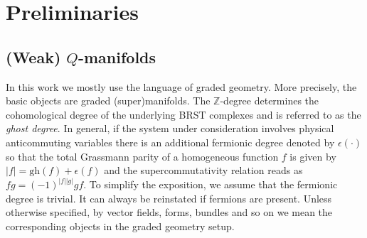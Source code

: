 \documentclass[a4paper,12pt]{article}
\numberwithin{equation}{section} %
\newcommand{\p}[1]{|#1|}
\newcommand{\gh}[1]{\mathrm{gh}(#1)}
\newcommand{\fZ}{\mathbb{Z}}
\begin{document}



\section{Preliminaries}\label{sec:prelim}

\subsection{(Weak) $Q$-manifolds}
In this work we mostly use the language of graded geometry. More precisely, the basic objects are graded (super)manifolds. The $\fZ$-degree determines the 
cohomological degree of the underlying BRST complexes and is referred to as the \textit{ghost degree}. In general, if the system under consideration involves physical anticommuting variables there is an additional fermionic degree denoted by $\epsilon(\cdot)$
 so that the total Grassmann parity of a homogeneous function $f$ is given by $\p{f}=\gh{f}+\epsilon(f)$
 and the supercommutativity relation reads as $fg=(-1)^{\p{f}\p{g}}gf$.
To simplify the exposition, we assume that the fermionic degree is trivial. It can always be reinstated if fermions are present. Unless otherwise specified, by vector fields, forms, bundles and so on we mean the corresponding objects in the graded geometry setup.
\end{document}
